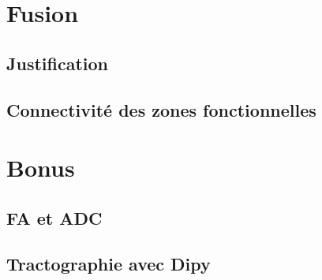 \documentclass[a4paper]{article}
\begin{document}
\section{Fusion}

\subsection{Justification}

\subsection{Connectivité des zones fonctionnelles}

\section{Bonus}

\subsection{FA et ADC}

\subsection{Tractographie avec Dipy}
\end{document}
